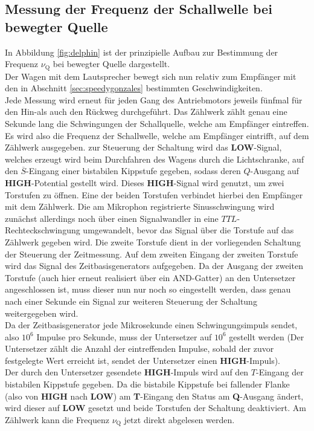 \FloatBarrier
\subsection{Messung der Frequenz der Schallwelle bei bewegter Quelle}
\label{sec:frequenz}
In Abbildung \ref{fig:delphin} ist der prinzipielle Aufbau zur Bestimmung der Frequenz $\nu_{\mathrm{Q}}$ bei bewegter Quelle dargestellt.\\
Der Wagen mit dem Lautsprecher bewegt sich nun relativ zum Empfänger mit den in Abschnitt \ref{sec:speedygonzales} bestimmten Geschwindigkeiten.\\
Jede Messung wird erneut für jeden Gang des Antriebmotors jeweils fünfmal für den Hin-als auch den Rückweg durchgeführt.
Das Zählwerk zählt genau eine Sekunde lang die Schwingungen der Schallquelle, welche am Empfänger eintreffen. Es wird also die Frequenz der Schallwelle, welche am Empfänger eintrifft, auf dem Zählwerk ausgegeben.
zur Steuerung der Schaltung wird das \textbf{LOW}-Signal, welches erzeugt wird beim Durchfahren des Wagens durch die Lichtschranke, auf den $\overline{S}$-Eingang einer bistabilen Kippstufe gegeben, sodass deren $Q$-Ausgang auf \textbf{HIGH}-Potential gestellt wird.
Dieses \textbf{HIGH}-Signal wird genutzt, um zwei Torstufen zu öffnen.
Eine der beiden Torstufen verbindet hierbei den Empfänger mit dem Zählwerk.
Die am Mikrophon registrierte Sinusschwingung wird zunächst allerdings noch über einen Signalwandler in eine $TTL$-Rechteckschwingung umgewandelt, bevor das Signal über die Torstufe auf das Zählwerk gegeben wird.
Die zweite Torstufe dient in der vorliegenden Schaltung der Steuerung der Zeitmessung.
Auf dem zweiten Eingang der zweiten Torstufe wird das Signal des Zeitbasisgenerators aufgegeben.
Da der Ausgang der zweiten Torstufe (auch hier erneut realisiert über ein AND-Gatter) an den Untersetzer angeschlossen ist, muss dieser nun nur noch so eingestellt werden, dass genau nach einer Sekunde ein Signal
zur weiteren Steuerung der Schaltung weitergegeben wird.\\
Da der Zeitbasisgenerator jede Mikrosekunde einen Schwingungsimpuls sendet, also $10^6$ Impulse pro Sekunde, muss der Untersetzer auf $10^6$ gestellt werden (Der Untersetzer zählt die Anzahl der eintreffenden Impulse, sobald der zuvor festgelegte Wert erreicht ist, sendet der Untersetzer einen \textbf{HIGH}-Impuls).\\
Der durch den Untersetzer gesendete \textbf{HIGH}-Impuls wird auf den $T$-Eingang der bistabilen Kippstufe gegeben. Da die bistabile Kippstufe bei fallender Flanke (also von \textbf{HIGH} nach \textbf{LOW}) am \textbf{T}-Eingang den Status am \textbf{Q}-Ausgang ändert, wird dieser auf \textbf{LOW} gesetzt und beide Torstufen der Schaltung deaktiviert.
Am Zählwerk kann die Frequenz $\nu_{\mathrm{Q}}$ jetzt direkt abgelesen werden.

